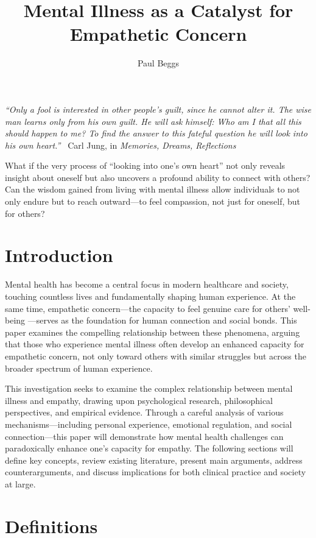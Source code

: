 \documentclass[stu]{apa7}
\title{Mental Illness as a Catalyst for Empathetic Concern}
\author{Paul Beggs}
\begin{document}
\maketitle

\textit{``Only a fool is interested in other people's guilt, since he cannot alter it. The wise man learns only from his own guilt. He will ask himself: Who am I that all this should happen to me? To find the answer to this fateful question he will look into his own heart.''} \textendash\ Carl Jung, in \textit{Memories, Dreams, Reflections}

What if the very process of ``looking into one's own heart'' not only reveals insight about oneself but also uncovers a profound ability to connect with others? Can the wisdom gained from living with mental illness allow individuals to not only endure but to reach outward—to feel compassion, not just for oneself, but for others?

\section{Introduction}

Mental health has become a central focus in modern healthcare and society, touching countless lives and fundamentally shaping human experience. At the same time, empathetic concern—the capacity to feel genuine care for others' well-being \parencite[adapted from][]{batson_empathyaltruism_2015}—serves as the foundation for human connection and social bonds. This paper examines the compelling relationship between these phenomena, arguing that those who experience mental illness often develop an enhanced capacity for empathetic concern, not only toward others with similar struggles but across the broader spectrum of human experience.

This investigation seeks to examine the complex relationship between mental illness and empathy, drawing upon psychological research, philosophical perspectives, and empirical evidence. Through a careful analysis of various mechanisms—including personal experience, emotional regulation, and social connection—this paper will demonstrate how mental health challenges can paradoxically enhance one's capacity for empathy. The following sections will define key concepts, review existing literature, present main arguments, address counterarguments, and discuss implications for both clinical practice and society at large.

\section{Definitions}
\end{document}
